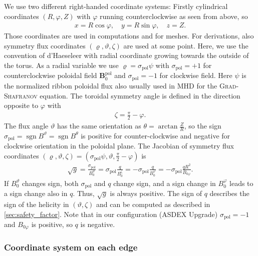 \documentclass[a4paper, 10pt, english]{article}
\let\temp\varrho
\let\varrho\rho
\let\rho\temp
\let\temp\vartheta
\let\vartheta\theta
\let\theta\temp
\let\temp\varphi
\let\varphi\phi
\let\phi\temp
\let\vec\symbf
\newcommand*\pol{\ensuremath{\textrm{pol}}}  %
\DeclareMathOperator\sgn{sgn}
\begin{document}
We use two different right-handed coordinate systems: Firstly cylindrical coordinates $(R, \phi, Z)$ with $\phi$ running counterclockwise as seen from above, so
\begin{gather*}
  x = R \cos \phi, \quad y = R \sin \phi, \quad z = Z.
\end{gather*}
Those coordinates are used in computations and for meshes. For derivations, also symmetry flux coordinates $(\rho, \theta, \zeta)$ are used at some point. Here, we use the convention of d'Haeseleer with radial coordinate growing towards the outside of the torus. As a radial variable we use $\rho = \sigma_{\pol} \psi$ with $\sigma_{\pol} = +1$ for counterclockwise poloidal field $\vec{B}_{0}^{\pol}$ and $\sigma_{\pol} = -1$ for clockwise field. Here $\psi$ is the normalized ribbon poloidal flux also usually used in MHD for the \textsc{Grad}-\textsc{Shafranov} equation. The toroidal symmetry angle is defined in the direction opposite to $\phi$ with
\begin{gather*}
  \zeta = \frac{\pi}{2} - \phi.
\end{gather*}
The flux angle $\theta$ has the same orientation as $\vartheta = \arctan \frac{Z}{R}$, so the sign $\sigma_{\pol} = \sgn B^{\theta} = \sgn B^{\vartheta}$ is positive for counter-clockwise and negative for clockwise orientation in the poloidal plane. The Jacobian of symmetry flux coordinates $(\rho, \theta, \zeta) = (\sigma_{\pol} \psi, \theta, \frac{\pi}{2} - \phi)$ is
\begin{gather}
  \sqrt{g} = \frac{\sigma_{\pol}}{B_{0}^{\theta}} = \sigma_{\pol} \frac{q}{B_{0}^{\zeta}} = -\sigma_{\pol} \frac{q}{B_{0}^{\phi}} = -\sigma_{\pol} \frac{q R^{2}}{B_{0 \phi}}.
\end{gather}
If $B_{0}^{\theta}$ changes sign, both $\sigma_{\pol}$ and $q$ change sign, and a sign change in $B_{0}^{\phi}$ leads to a sign change also in $q$. Thus, $\sqrt{g}$ is always positive. The sign of $q$ describes the sign of the helicity in $(\theta, \zeta)$ and can be computed as described in \cref{sec:safety_factor}. Note that in our configuration (ASDEX Upgrade) $\sigma_{\pol} = -1$ and $B_{0 \phi}$ is positive, so $q$ is negative.

\subsubsection{Coordinate system on each edge}
\end{document}

